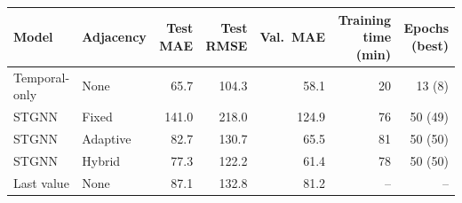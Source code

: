 \begin{tabular}{llrrrrr}
\toprule
Model & Adjacency & Test MAE & Test RMSE & Val.\ MAE & Training time (min) & Epochs (best) \\
\midrule
Temporal-only & None & 65.7 & 104.3 & 58.1 & 20 & 13 (8) \\
STGNN & Fixed & 141.0 & 218.0 & 124.9 & 76 & 50 (49) \\
STGNN & Adaptive & 82.7 & 130.7 & 65.5 & 81 & 50 (50) \\
STGNN & Hybrid & 77.3 & 122.2 & 61.4 & 78 & 50 (50) \\
\midrule
Last value & None & 87.1 & 132.8 & 81.2 & -- & -- \\
\bottomrule
\end{tabular}
